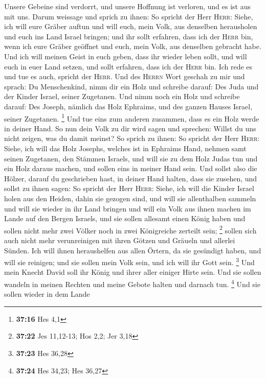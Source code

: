 Unsere Gebeine sind verdorrt, und unsere Hoffnung ist verloren, und es
ist aus mit uns.  Darum weissage und sprich zu ihnen: So
spricht der Herr \textsc{Herr}: Siehe, ich will eure Gräber auftun und
will euch, mein Volk, aus denselben herausholen und euch ins Land Israel
bringen;  und ihr sollt erfahren, dass ich der
\textsc{Herr} bin, wenn ich eure Gräber geöffnet und euch, mein Volk,
aus denselben gebracht habe.  Und ich will meinen Geist
in euch geben, dass ihr wieder leben sollt, und will euch in euer Land
setzen, und sollt erfahren, dass ich der \textsc{Herr} bin. Ich rede es
und tue es auch, spricht der \textsc{Herr}.  Und des
\textsc{Herrn} Wort geschah zu mir und sprach:  Du
Menschenkind, nimm dir ein Holz und schreibe darauf: Des Juda und der
Kinder Israel, seiner Zugetanen. Und nimm noch ein Holz und schreibe
darauf: Des Joseph, nämlich das Holz Ephraims, und des ganzen Hauses
Israel, seiner Zugetanen. \footnote{\textbf{37:16} Hes 4,1}
 Und tue eins zum anderen zusammen, dass es ein Holz
werde in deiner Hand.  So nun dein Volk zu dir wird sagen
und sprechen: Willst du uns nicht zeigen, was du damit meinst?
 So sprich zu ihnen: So spricht der Herr \textsc{Herr}:
Siehe, ich will das Holz Josephs, welches ist in Ephraims Hand, nehmen
samt seinen Zugetanen, den Stämmen Israels, und will sie zu dem Holz
Judas tun und ein Holz daraus machen, und sollen eins in meiner Hand
sein.  Und sollst also die Hölzer, darauf du geschrieben
hast, in deiner Hand halten, dass sie zusehen,  und
sollst zu ihnen sagen: So spricht der Herr \textsc{Herr}: Siehe, ich
will die Kinder Israel holen aus den Heiden, dahin sie gezogen sind, und
will sie allenthalben sammeln und will sie wieder in ihr Land bringen
 und will ein Volk aus ihnen machen im Lande auf den
Bergen Israels, und sie sollen allesamt einen König haben und sollen
nicht mehr zwei Völker noch in zwei Königreiche zerteilt sein;
\footnote{\textbf{37:22} Jes 11,12-13; Hos 2,2; Jer 3,18}
 sollen sich auch nicht mehr verunreinigen mit ihren
Götzen und Gräueln und allerlei Sünden. Ich will ihnen heraushelfen aus
allen Örtern, da sie gesündigt haben, und will sie reinigen; und sie
sollen mein Volk sein, und ich will ihr Gott sein. \footnote{\textbf{37:23}
  Hes 36,28}  Und mein Knecht David soll ihr König und
ihrer aller einiger Hirte sein. Und sie sollen wandeln in meinen Rechten
und meine Gebote halten und darnach tun. \footnote{\textbf{37:24} Hes
  34,23; Hes 36,27}  Und sie sollen wieder in dem Lande

